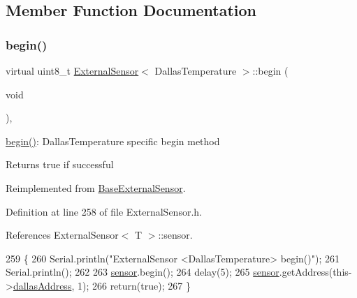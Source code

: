 \subsection{Member Function Documentation}
\mbox{\label{classExternalSensor_3_01DallasTemperature_01_4_ac5275129b05e2ff8df45d5b222a661d9}} 
\subsubsection{\texorpdfstring{begin()}{begin()}}
{\footnotesize\ttfamily virtual uint8\+\_\+t \hyperlink{classExternalSensor}{External\+Sensor}$<$ Dallas\+Temperature $>$\+::begin (\begin{DoxyParamCaption}\item[{void}]{ }\end{DoxyParamCaption})\hspace{0.3cm}{\ttfamily [inline]}, {\ttfamily [virtual]}}

\hyperlink{classExternalSensor_3_01DallasTemperature_01_4_ac5275129b05e2ff8df45d5b222a661d9}{begin()}\+: Dallas\+Temperature specific begin method

\begin{DoxyReturn}{Returns}
true if successful 
\end{DoxyReturn}


Reimplemented from \hyperlink{classBaseExternalSensor_a87d132803d4f4fdd4e66332809f0c9a0}{Base\+External\+Sensor}.



Definition at line 258 of file External\+Sensor.\+h.



References External\+Sensor$<$ T $>$\+::sensor.


\begin{DoxyCode}
259     \{
260         Serial.println(\textcolor{stringliteral}{"ExternalSensor <DallasTemperature> begin()"});
261         Serial.println();
262         
263         \hyperlink{classExternalSensor_3_01DallasTemperature_01_4_adb6ba4fcdedef95ad8f6b0c9b6c0f9d1}{sensor}.begin(); 
264         delay(5);
265         \hyperlink{classExternalSensor_3_01DallasTemperature_01_4_adb6ba4fcdedef95ad8f6b0c9b6c0f9d1}{sensor}.getAddress(this->\hyperlink{classExternalSensor_3_01DallasTemperature_01_4_a7d9e9d2893e453638fcf440e5d8d9082}{dallasAddress}, 1);   
266         \textcolor{keywordflow}{return}(\textcolor{keyword}{true});
267     \}
\end{DoxyCode}
\mbox{\label{classExternalSensor_3_01DallasTemperature_01_4_a1e725d9338314515d4e5dc456ed6a6c8}} 
